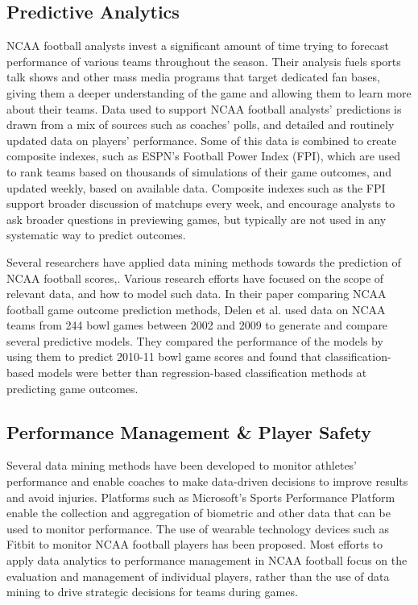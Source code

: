 \documentclass[sigconf]{acmart}
\begin{document}
\subsection{Predictive Analytics}
NCAA football analysts invest a significant amount of time trying to forecast performance of various teams throughout the season. Their analysis fuels sports talk shows and other mass media programs that target dedicated fan bases, giving them a deeper understanding of the game and allowing them to learn more about their teams. Data used to support NCAA football analysts' predictions is drawn from a mix of sources such as coaches' polls, and detailed and routinely updated data on players' performance. Some of this data is combined to create composite indexes, such as ESPN's Football Power Index (FPI)\cite{espn2017}, which are used to rank teams based on thousands of simulations of their game outcomes, and updated weekly, based on available data. Composite indexes such as the FPI support broader discussion of matchups every week, and encourage analysts to ask broader questions in previewing games, but typically are not used in any systematic way to predict outcomes.

Several researchers have applied data mining methods towards the prediction of NCAA football scores\cite{Leung2014},\cite{Delen2012}. Various research efforts have focused on the scope of relevant data, and how to model such data. In their paper comparing NCAA football game outcome prediction methods, Delen et al. used data on NCAA teams from 244 bowl games between 2002 and 2009 to generate and compare several predictive models\cite{Delen2012}. They compared the performance of the models by using them to predict 2010-11 bowl game scores and found that classification-based models were better than regression-based classification methods at predicting game outcomes. 

\subsection{Performance Management \& Player Safety}
Several data mining methods have been developed to monitor athletes' performance and enable coaches to make data-driven decisions to improve results and avoid injuries. Platforms such as Microsoft's Sports Performance Platform \cite{Hansen2017} enable the collection and aggregation of biometric and other data that can be used to monitor performance. The use of wearable technology devices such as Fitbit to monitor NCAA football players has been proposed. Most efforts to apply data analytics to performance management in NCAA football focus on the evaluation and management of individual players, rather than the use of data mining to drive strategic decisions for teams during games.
\end{document}
